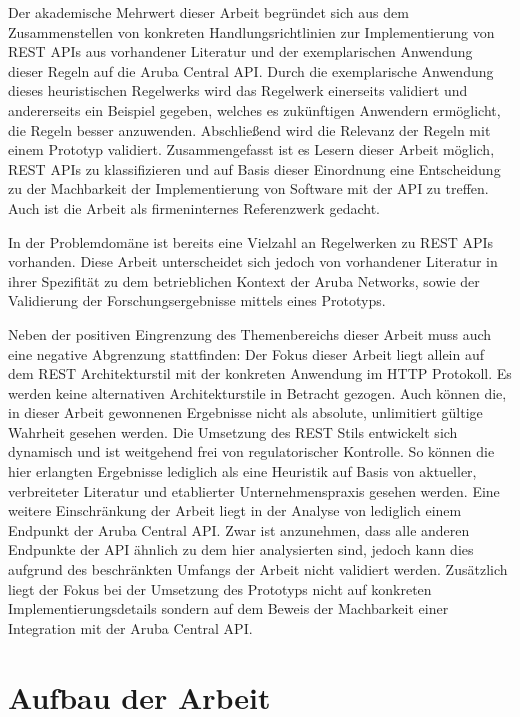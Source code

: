 Der akademische Mehrwert dieser Arbeit begründet sich aus dem Zusammenstellen von konkreten Handlungsrichtlinien zur Implementierung von REST APIs aus vorhandener Literatur und der exemplarischen Anwendung dieser Regeln auf die Aruba Central API. Durch die exemplarische Anwendung dieses heuristischen Regelwerks wird das Regelwerk einerseits validiert und andererseits ein Beispiel gegeben, welches es zukünftigen Anwendern ermöglicht, die Regeln besser anzuwenden. Abschließend wird die Relevanz der Regeln mit einem Prototyp validiert. Zusammengefasst ist es Lesern dieser Arbeit möglich, REST APIs zu klassifizieren und auf Basis dieser Einordnung eine Entscheidung zu der Machbarkeit der Implementierung von Software mit der API zu treffen. Auch ist die Arbeit als firmeninternes Referenzwerk gedacht.

In der Problemdomäne ist bereits eine Vielzahl an Regelwerken zu REST APIs vorhanden. Diese Arbeit unterscheidet sich jedoch von vorhandener Literatur in ihrer Spezifität zu dem betrieblichen Kontext der Aruba Networks, sowie der Validierung der Forschungsergebnisse mittels eines Prototyps.

Neben der positiven Eingrenzung des Themenbereichs dieser Arbeit muss auch eine negative Abgrenzung stattfinden: Der Fokus dieser Arbeit liegt allein auf dem REST Architekturstil mit der konkreten Anwendung im HTTP Protokoll. Es werden keine alternativen Architekturstile in Betracht gezogen. Auch können die, in dieser Arbeit gewonnenen Ergebnisse nicht als absolute, unlimitiert gültige Wahrheit gesehen werden. Die Umsetzung des REST Stils entwickelt sich dynamisch und ist weitgehend frei von regulatorischer Kontrolle. So können die hier erlangten Ergebnisse lediglich als eine Heuristik auf Basis von aktueller, verbreiteter Literatur und etablierter Unternehmenspraxis gesehen werden. Eine weitere Einschränkung der Arbeit liegt in der Analyse von lediglich einem Endpunkt der Aruba Central API. Zwar ist anzunehmen, dass alle anderen Endpunkte der API ähnlich zu dem hier analysierten sind, jedoch kann dies aufgrund des beschränkten Umfangs der Arbeit nicht validiert werden. Zusätzlich liegt der Fokus bei der Umsetzung des Prototyps nicht auf konkreten Implementierungsdetails sondern auf dem Beweis der Machbarkeit einer Integration mit der Aruba Central API.


\section{Aufbau der Arbeit}\label{section:aufbau-der-arbeit}

